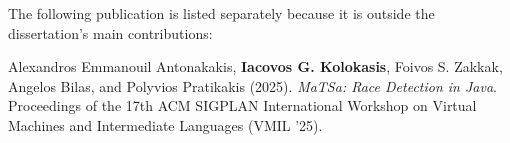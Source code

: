 The following publication is listed separately because it is outside the dissertation's main contributions:

Alexandros Emmanouil Antonakakis, \textbf{Iacovos G. Kolokasis}, Foivos S. Zakkak, Angelos Bilas, and Polyvios Pratikakis (2025).
\emph{MaTSa: Race Detection in Java}.
Proceedings of the 17th ACM SIGPLAN International Workshop on Virtual Machines and Intermediate Languages (VMIL '25).









